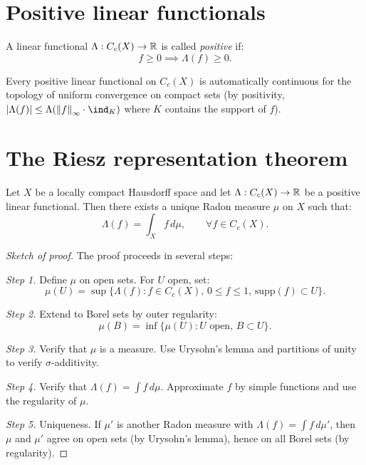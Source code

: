 \section{Positive linear functionals}

\begin{definition}
A linear functional $\Lambda : C_c(X) \to \mathbb{R}$ is called \emph{positive} if:
\[
    f \geq 0 \implies \Lambda(f) \geq 0.
\]
\end{definition}

\begin{remark}
Every positive linear functional on $C_c(X)$ is automatically continuous for the
topology of uniform convergence on compact sets (by positivity,
$\abs{\Lambda(f)} \leq \Lambda(\norm{f}_\infty \cdot \ind_K)$ where $K$ contains
the support of $f$).
\end{remark}

\section{The Riesz representation theorem}

\begin{theorem}
\label{thm:riesz}
Let $X$ be a locally compact Hausdorff space and let $\Lambda : C_c(X) \to \mathbb{R}$ be a
positive linear functional. Then there exists a unique Radon measure $\mu$ on $X$
such that:
\[
    \Lambda(f) = \int_X f\, d\mu, \qquad \forall f \in C_c(X).
\]
\end{theorem}

\begin{proof}[Sketch of proof]
The proof proceeds in several steps:

\emph{Step 1.} Define $\mu$ on open sets. For $U$ open, set:
\[
    \mu(U) = \sup\{\Lambda(f) : f \in C_c(X),\, 0 \leq f \leq 1,\,
    \mathrm{supp}(f) \subset U\}.
\]

\emph{Step 2.} Extend to Borel sets by outer regularity:
\[
    \mu(B) = \inf\{\mu(U) : U \text{ open},\, B \subset U\}.
\]

\emph{Step 3.} Verify that $\mu$ is a measure. Use Urysohn's lemma and partitions of
unity to verify $\sigma$-additivity.

\emph{Step 4.} Verify that $\Lambda(f) = \int f\, d\mu$. Approximate $f$ by simple
functions and use the regularity of $\mu$.

\emph{Step 5.} Uniqueness. If $\mu'$ is another Radon measure with
$\Lambda(f) = \int f\, d\mu'$, then $\mu$ and $\mu'$ agree on open sets (by
Urysohn's lemma), hence on all Borel sets (by regularity).
\end{proof}

